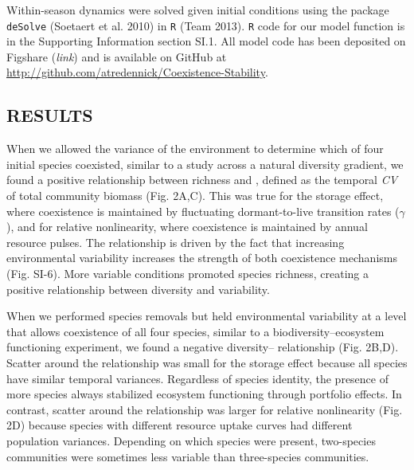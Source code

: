 \documentclass[12pt,]{article}
\begin{document}
Within-season dynamics were solved given initial conditions using the
package \texttt{deSolve} (Soetaert et al. 2010) in \texttt{R} (Team
2013). \texttt{R} code for our model function is in the Supporting
Information section SI.1. All model code has been deposited on Figshare
(\emph{link}) and is available on GitHub at
\url{http://github.com/atredennick/Coexistence-Stability}.

\subsection{RESULTS}\label{results}

When we allowed the variance of the environment to determine which of
four initial species coexisted, similar to a study across a natural
diversity gradient, we found a positive relationship between richness
and , defined as the temporal \emph{CV} of
total community biomass (Fig. 2A,C). This was true for the storage
effect, where coexistence is maintained by fluctuating dormant-to-live
transition rates (\(\gamma\)), and for relative nonlinearity, where
coexistence is maintained by annual resource pulses. The relationship is
driven by the fact that increasing environmental variability increases
the strength of both coexistence mechanisms (Fig. SI-6). More variable
conditions promoted species richness, creating a positive relationship
between diversity and  variability.

When we performed species removals but held environmental variability at
a level that allows coexistence of all four species, similar to a
biodiversity--ecosystem functioning experiment, we found a negative
diversity-- relationship (Fig. 2B,D). Scatter
around the relationship was small for the storage effect because all
species have similar temporal variances. Regardless of species identity,
the presence of more species always stabilized ecosystem functioning
through portfolio effects. In contrast, scatter around the relationship
was larger for relative nonlinearity (Fig. 2D) because species with
different resource uptake curves had different population variances.
Depending on which species were present, two-species communities were
sometimes less variable than three-species communities.
\end{document}
